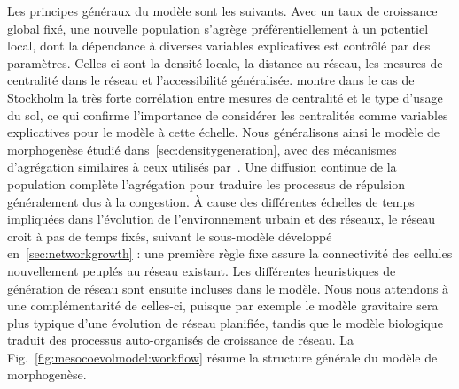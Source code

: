 {Les principes généraux du modèle sont les suivants. Avec un taux de croissance global fixé, une nouvelle population s'agrège préférentiellement à un potentiel local, dont la dépendance à diverses variables explicatives est contrôlé par des paramètres. Celles-ci sont la densité locale, la distance au réseau, les mesures de centralité dans le réseau et l'accessibilité généralisée. \cite{doi:10.1080/13658816.2014.893347} montre dans le cas de Stockholm la très forte corrélation entre mesures de centralité et le type d'usage du sol, ce qui confirme l'importance de considérer les centralités comme variables explicatives pour le modèle à cette échelle. Nous généralisons ainsi le modèle de morphogenèse étudié dans~\ref{sec:densitygeneration}, avec des mécanismes d'agrégation similaires à ceux utilisés par~\cite{raimbault2014hybrid}. Une diffusion continue de la population complète l'agrégation pour traduire les processus de répulsion généralement dus à la congestion. À cause des différentes échelles de temps impliquées dans l'évolution de l'environnement urbain et des réseaux, le réseau croit à pas de temps fixés, suivant le sous-modèle développé en~\ref{sec:networkgrowth} : une première règle fixe assure la connectivité des cellules nouvellement peuplés au réseau existant. Les différentes heuristiques de génération de réseau sont ensuite incluses dans le modèle. Nous nous attendons à une complémentarité de celles-ci, puisque par exemple le modèle gravitaire sera plus typique d'une évolution de réseau planifiée, tandis que le modèle biologique traduit des processus auto-organisés de croissance de réseau. La Fig.~\ref{fig:mesocoevolmodel:workflow} résume la structure générale du modèle de morphogenèse.
}




